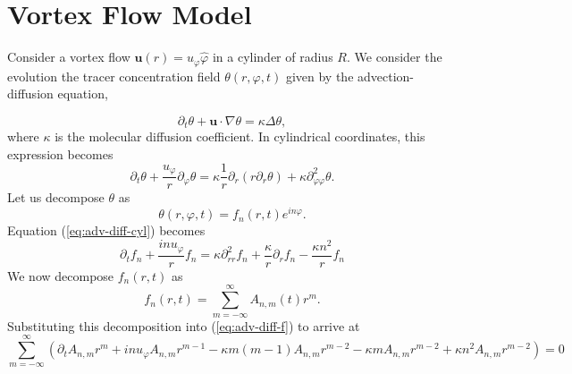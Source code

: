 \documentclass[12pt]{article}
\begin{document}
\section{Vortex Flow Model}

Consider a vortex flow $\mathbf{u}(r)=u_{\varphi}\hat{\varphi}$ in a cylinder of radius $R$.  We consider the evolution the tracer concentration field $\theta(r,\varphi,t)$ given by the advection-diffusion equation,

\begin{equation}
\label{eq:adv-diff}
\partial_{t}\theta + \mathbf{u}\cdot \nabla \theta = \kappa \Delta \theta,
\end{equation}
where $\kappa$ is the molecular diffusion coefficient.  In cylindrical coordinates, this expression becomes
\begin{equation}
\label{eq:adv-diff-cyl}
\partial_{t}\theta + \frac{u_{\varphi}}{r}\partial_{\varphi}\theta=\kappa \frac{1}{r}\partial_{r}(r\partial_{r}\theta)+\kappa \partial_{\varphi \varphi}^{2}\theta .
\end{equation}
Let us decompose $\theta$ as \cite{Kwiatkowski2010, BAJER2001,Rhines1983}
\begin{equation}
\label{eq:th_decomp}
\theta(r,\varphi,t)=f_{n}(r,t)e^{in\varphi}.
\end{equation}
Equation (\ref{eq:adv-diff-cyl}) becomes
\begin{equation}
\label{eq:adv-diff-f}
\partial_t f_{n} + \frac{in u_{\varphi}}{r}f_{n} = \kappa \partial_{rr}^{2}f_{n}+ \frac{\kappa}{r}\partial_r f_{n} -\frac{\kappa n^2}{r}f_{n}
\end{equation}
We now decompose $f_{n}(r,t)$ as
\begin{equation}
f_{n}(r,t)=\sum_{m=-\infty}^{\infty}A_{n,m}(t)r^{m}.
\end{equation}
Substituting this decomposition into (\ref{eq:adv-diff-f}) to arrive at
\begin{equation}
\sum_{m=-\infty}^{\infty}\left(\partial_{t}A_{n,m} r^m + inu_{\varphi}A_{n,m} r^{m-1} - \kappa m (m-1)A_{n,m}r^{m-2} -  \kappa m A_{n,m}r^{m-2} + \kappa  n^2 A_{n,m} r^{m-2}  \right) = 0
\end{equation}
\end{document}
